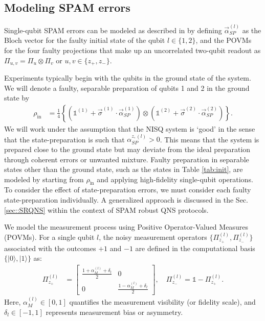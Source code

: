 \documentclass[%
 reprint,
superscriptaddress,
 amsmath,amssymb,
 aps,
pra,
floatfix,
]{revtex4-2}
\begin{document}
\subsection{Modeling SPAM errors}
Single-qubit SPAM errors can be modeled as described in \cite{PhysRevApplied.22.024074} by defining $\vec{\alpha}^{(l)}_{SP}$ as the Bloch vector for the faulty initial state of the qubit $l\in\{1,2\}$, and the POVMs for the four faulty projections that make up an uncorrelated two-qubit readout as $\Pi_{u,v}=\Pi_u\otimes\Pi_v$ or $u,v\in\{z_+,z_-\}$.

Experiments typically begin with the qubits in the ground state of the system. We will denote a faulty, separable preparation of qubits 1 and 2 in the ground state by
\begin{align}
    \rho_\text{in}&=\frac{1}{4}\left\{(\mathbb{1}^{(1)}+\vec{\sigma}^{(1)}\cdot\vec\alpha^{(1)}_{SP})\otimes(\mathbb{1}^{(2)}+\vec{\sigma}^{(2)}\cdot\vec\alpha^{(2)}_{SP})\right\}.
\end{align}
We will work under the assumption that the NISQ system is `good' in the sense that the state-preparation is such that $\alpha^{z,(l)}_{SP}>0$. This means that the system is prepared close to the ground state but may deviate from the ideal preparation through coherent errors or unwanted mixture. Faulty preparation in separable states other than the ground state, such as the states in Table \ref{tab:init}, are modeled by starting from $\rho_\text{in}$ and applying high-fidelity single-qubit operations. To consider the effect of state-preparation errors, we must consider each faulty state-preparation individually. A generalized approach is discussed in the Sec. \ref{sec::SRQNS} within the context of SPAM robust QNS protocols.

We model the measurement process using Positive Operator-Valued Measures (POVMs). For a single qubit $l$, the noisy measurement operators $\{\Pi^{(l)}_{z_+}, \Pi^{(l)}_{z_-}\}$ associated with the outcomes $+1$ and $-1$ are defined in the computational basis $\{|0\rangle, |1\rangle\}$ as:
\begin{align}
    \Pi^{(l)}_{z_+}&=\begin{bmatrix}
        \frac{1+\alpha^{(l)}_M+\delta_l}{2} & 0\\
        0 & \frac{1-\alpha^{(l)}_M+\delta_l}{2}
    \end{bmatrix}, \quad
    \Pi^{(l)}_{z_-} = \mathbb{1} - \Pi^{(l)}_{z_+}.
\end{align}
Here, $\alpha_M^{(l)} \in [0,1]$ quantifies the measurement visibility (or fidelity scale), and $\delta_l \in [-1,1]$ represents measurement bias or asymmetry. 
\end{document}
